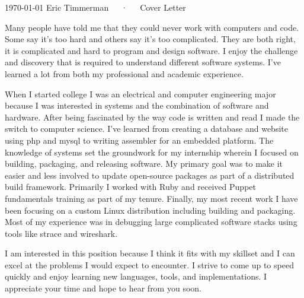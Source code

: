 \documentclass[11pt, letterpaper]{awesome-cv}
\begin{document}
\makecvheader

\makecvfooter
  {\today}
  {Eric Timmerman~~~·~~~Cover Letter}
  {}

\makelettertitle

\begin{cvletter}

Many people have told me that they could never work with computers and code. Some say it's too hard and others say it's too complicated. They are both right, it is complicated and hard to program and design software. I enjoy the challenge and discovery that is required to understand different software systems. I've learned a lot from both my professional and academic experience.

When I started college I was an electrical and computer engineering major because I was interested in systems and the combination of software and hardware. After being fascinated by the way code is written and read I made the switch to computer science. I've learned from creating a database and website using php and mysql to writing assembler for an embedded platform.
The knowledge of systems set the groundwork for my internship wherein I focused on building, packaging, and releasing software. My primary goal was to make it easier and less involved to update open-source packages as part of a distributed build framework. Primarily I worked with Ruby and received Puppet fundamentals training as part of my tenure. Finally, my most recent work I have been focusing on a custom Linux distribution including building and packaging. Most of my experience was in debugging large complicated software stacks using tools like strace and wireshark.

I am interested in this position because I think it fits with my skillset and I can excel at the problems I would expect to encounter. I strive to come up to speed quickly and enjoy learning new languages, tools, and implementations. I appreciate your time and hope to hear from you soon.

\end{cvletter}


\makeletterclosing
\end{document}
